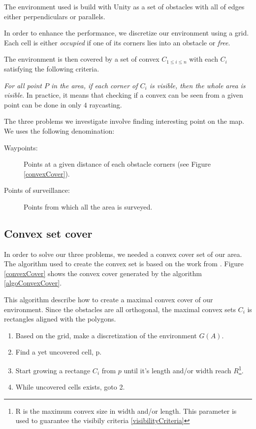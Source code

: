 The environment used is build with Unity as a set of obstacles with all of edges either perpendiculars or parallels.

In order to enhance the performance, we discretize our environment using a grid. Each cell is either \emph{occupied} if one of its corners lies into an obstacle or \emph{free}.

The environment is then covered by a set of convex $C_{1\leq i \leq n}$ with each $C_i$ satisfying the following criteria.

\begin{criteria}[of Visibility]
 \emph{For all point $P$ in the area, if each corner of $C_i$ is visible, then the whole area is visible}. In practice, it means that checking if a convex can be seen from a given point can be done in only $4$ raycasting.
\label{visibilityCriteria}
\end{criteria}

The three problems we investigate involve finding interesting point on the map. We uses the following denomination:
\begin{description}
	\item[Waypoints:] Points at a given distance of each obstacle corners (see Figure \ref{convexCover}).
	\item[Points of surveillance:] Points from which all the area is surveyed.
\end{description}

\subsection{Convex set cover}

In order to solve our three problems, we needed a convex cover set of our area. The algorithm used to create the convex set is based on the work from \cite{CoopMinTime}. Figure \ref{convexCover} shows the convex cover generated by the algorithm \ref{algoConvexCover}.

\begin{algorithm}
This algorithm describe how to create a maximal convex cover of our environment. Since the obstacles are all orthogonal, the maximal convex sets $C_i$ is rectangles aligned with the polygons.
\begin{enumerate}
\item Based on the grid, make a discretization of the environment $G(A)$.
\item Find a yet uncovered cell, p.
\item Start growing a rectange $C_i$ from $p$ until it's length and/or width reach $R$\footnote{R is the maximum convex size in width and/or length. This parameter is used to guarantee the visibily criteria \ref{visibilityCriteria}}.
\item While uncovered cells exists, goto 2.
\end{enumerate}
\label{algoConvexCover}
\end{algorithm}

